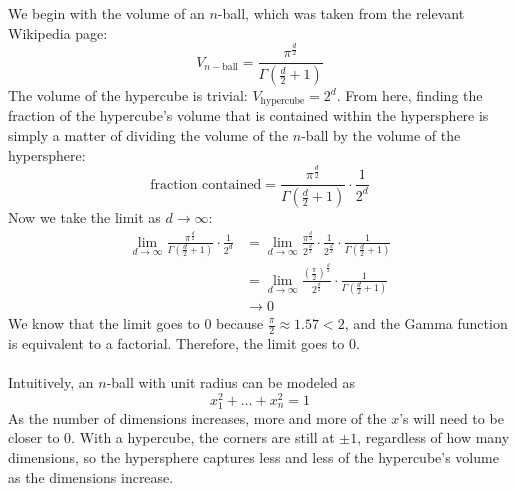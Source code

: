 \documentclass[submit]{harvardml}
\begin{document}
We begin with the volume of an $n$-ball, which was taken from the relevant Wikipedia page:
	$$V_{n-\text{ball}} = \frac{\pi^{\frac{d}{2}}}{\Gamma\left(\frac{d}{2} + 1\right)}$$
The volume of the hypercube is trivial: $V_{\text{hypercube}} = 2^d$. From here, finding the fraction of the hypercube's volume that is contained within the hypersphere is simply a matter
of dividing the volume of the $n$-ball by the volume of the hypersphere:
	$$\text{fraction contained} = \frac{\pi^{\frac{d}{2}}}{\Gamma\left(\frac{d}{2} + 1\right)} \cdot
	\frac{1}{2^d}$$
Now we take the limit as $d \rightarrow \infty$:
	\begin{align*}
		\lim_{d \rightarrow \infty}  \frac{\pi^{\frac{d}{2}}}{\Gamma\left(\frac{d}{2} + 1\right)} \cdot
	\frac{1}{2^d} &= \lim_{d\rightarrow \infty}  \frac{\pi^{\frac{d}{2}}}{2^{\frac{d}{2}}} \cdot \frac{1}{2^{\frac{d}{2}}} \cdot \frac{1}{{\Gamma\left(\frac{d}{2} + 1\right)}}\\
	&= \lim_{d\rightarrow \infty} \frac{\left(\frac{\pi}{2}\right)^{\frac{d}{2}}}{2^{\frac{d}{2}}}
	 \cdot \frac{1}{{\Gamma\left(\frac{d}{2} + 1\right)}}\\
	 &\rightarrow 0
	\end{align*}
We know that the limit goes to 0 because $\frac{\pi}{2} \approx 1.57 < 2$, and the Gamma function is equivalent to a factorial. Therefore, the limit goes to 0. \\ \\
Intuitively, an $n$-ball with unit radius can be modeled as 
	$$x^2_1 + \dots + x^2_n = 1$$
As the number of dimensions increases, more and more of the $x$'s will need to be closer to 0. With a hypercube, the corners are still at $\pm 1$, regardless of how many dimensions, so the hypersphere captures less and less of the hypercube's volume as the dimensions increase. 	
\newpage
\end{document}
